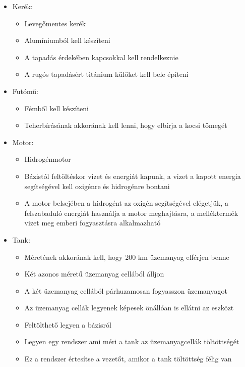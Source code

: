 \documentclass[12pt]{report}
\begin{document}
\begin{itemize}
    \item {} Kerék: 
        \begin{itemize}
            \item Levegőmentes kerék
            \item Alumíniumból kell készíteni
            \item A tapadás érdekében kapcsokkal kell rendelkeznie
            \item A rugós tapadásért titánium külőket kell bele építeni
        \end{itemize}
    \item {} Futómű:
        \begin{itemize}
            \item Fémből kell készíteni
            \item Teherbírásának akkorának kell lenni, hogy elbírja a kocsi tömegét
        \end{itemize}
    \item {} Motor:
        \begin{itemize}
            \item Hidrogénmotor
            \item Bázistól feltöltéskor vizet és energiát kapunk, a vizet a kapott energia segítségével kell oxigénre és hidrogénre bontani
            \item A motor belsejében a hidrogént az oxigén segítségével elégetjük, a felszabaduló energiát használja a motor meghajtásra, a melléktermék vizet meg emberi fogyasztásra alkalmazható
        \end{itemize}
    \item {} Tank:
        \begin{itemize}
            \item Méretének akkorának kell, hogy 200 km üzemanyag elférjen benne
            \item Két azonos méretű üzemanyag cellából álljon
            \item A két üzemanyag cellából párhuzamosan fogyasszon üzemanyagot
            \item Az üzemanyag cellák legyenek képesek önállóan is ellátni az eszközt
            \item Feltölthető legyen a bázisról
            \item Legyen egy rendszer ami méri a tank az üzemanyagcellák töltöttségét
            \item Ez a rendszer értesítse a vezetőt, amikor a tank töltöttség félig van

\end{itemize}
\end{itemize}
\end{document}
